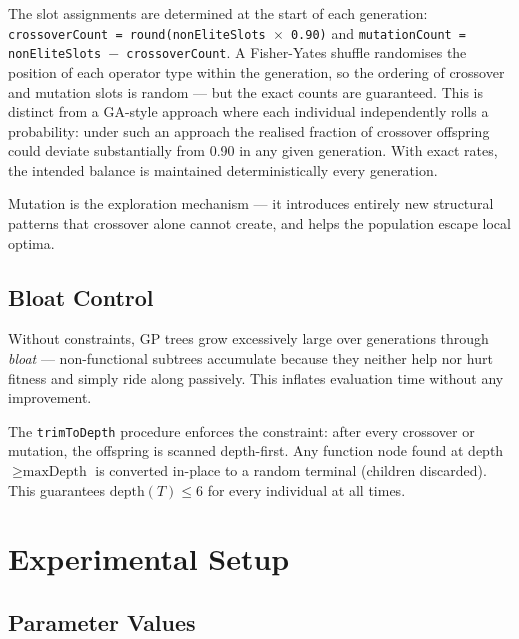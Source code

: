 \documentclass[12pt,a4paper]{article}
\begin{document}
The slot assignments are determined at the start of each generation: \texttt{crossoverCount = round(nonEliteSlots $\times$ 0.90)} and \texttt{mutationCount = nonEliteSlots $-$ crossoverCount}. A Fisher-Yates shuffle randomises the position of each operator type within the generation, so the ordering of crossover and mutation slots is random --- but the exact counts are guaranteed. This is distinct from a GA-style approach where each individual independently rolls a probability: under such an approach the realised fraction of crossover offspring could deviate substantially from 0.90 in any given generation. With exact rates, the intended balance is maintained deterministically every generation.

Mutation is the exploration mechanism --- it introduces entirely new structural patterns that crossover alone cannot create, and helps the population escape local optima.

\subsection{Bloat Control}

Without constraints, GP trees grow excessively large over generations through \emph{bloat} --- non-functional subtrees accumulate because they neither help nor hurt fitness and simply ride along passively. This inflates evaluation time without any improvement.

The \texttt{trimToDepth} procedure enforces the constraint: after every crossover or mutation, the offspring is scanned depth-first. Any function node found at depth $\geq \text{maxDepth}$ is converted in-place to a random terminal (children discarded). This guarantees $\text{depth}(T) \leq 6$ for every individual at all times.

\section{Experimental Setup}

\subsection{Parameter Values}
\end{document}
